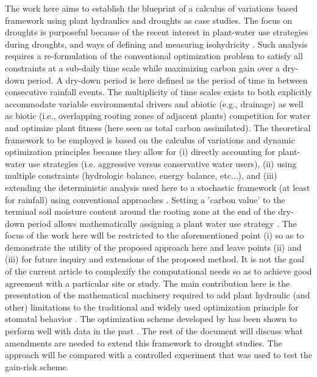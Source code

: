 \documentclass[utf8]{frontiersSCNS} %
\begin{document}
The work here aims to establish the blueprint of a calculus of variations based framework using plant hydraulics and droughts as case studies.  The focus on droughts is purposeful because of the recent interest in plant-water use strategies during droughts, and ways of defining and measuring isohydricity \citep{franks_anisohydric_2007,martinezvilalta_new_2014,meinzer_mapping_2016}.  Such analysis requires a re-formulation of the conventional optimization problem to satisfy all constraints at a sub-daily time scale while maximizing carbon gain over a dry-down period. A dry-down period is here defined as the period of time in between consecutive rainfall events. The multiplicity of time scales exists to both explicitly accommodate variable environmental drivers and abiotic (e.g., drainage) as well as biotic (i.e., overlapping rooting zones of adjacent plants) competition for water and optimize plant fitness (here seen as total carbon assimilated). The theoretical framework to be employed is based on the calculus of variations and dynamic optimization principles because they allow for (i) directly accounting for plant-water use strategies (i.e. aggressive versus conservative water users), (ii) using multiple constraints (hydrologic balance, energy balance, etc...), and  (iii) extending the deterministic analysis used here to a stochastic framework (at least for rainfall) using conventional approaches  \citep{cowan1986economics,makela1996optimal,manzoni_optimization_2013,lu2016optimal}.  Setting a 'carbon value' to the terminal soil moisture content around the rooting zone at the end of the dry-down period allows mathematically assigning a plant water use strategy \citep{manzoni_optimization_2013}.   The focus of the work here will be restricted to the aforementioned point (i) so as to demonstrate the utility of the proposed approach here and leave points (ii) and (iii) for future inquiry and extensions of the proposed method. It is not the goal of the current article to complexify the computational needs so as to achieve good agreement with a particular site or study. The main contribution here is the presentation of the mathematical machinery required to add plant hydraulic (and other) limitations to the traditional and widely used optimization principle for stomatal behavior \citep{cowan_stomatal_1977,cowan1986economics}. The optimization scheme developed by \citep{cowan_stomatal_1977} has been shown to perform well with data in the past \citep{dubois_2007,gu_2010}. The rest of the document will discuss what amendments are needed to extend this framework to drought studies.  The approach will be compared with a controlled experiment \citep{venturas_2018} that was used to test the gain-risk scheme.
\end{document}
